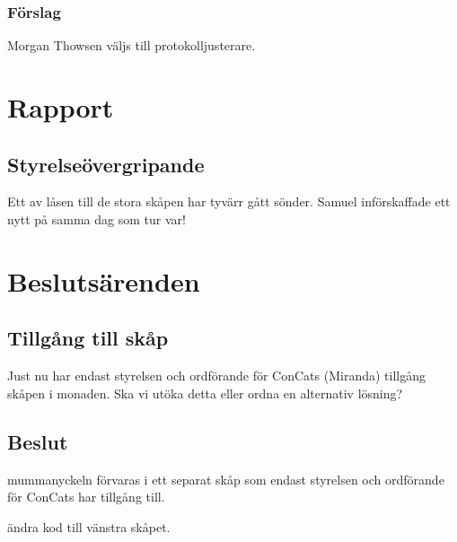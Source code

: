 \documentclass[protokoll]{dvd}
\begin{document}
        \subsubsection*{Förslag}
            \begin{attsatser}
                \item Morgan Thowsen väljs till protokolljusterare.
            \end{attsatser}


\newpage

\newpage

\section{Rapport}
   \subsection*{Styrelseövergripande}
        Ett av låsen till de stora skåpen har tyvärr gått sönder. Samuel införskaffade ett nytt på samma dag som tur var!

\newpage

\section{Beslutsärenden}
    \subsection*{Tillgång till skåp}
    Just nu har endast styrelsen och ordförande för ConCats (Miranda) tillgång skåpen i monaden.
    Ska vi utöka detta eller ordna en alternativ lösning?

    \subsection*{Beslut}
        \begin{attsatser}
            \item mummanyckeln förvaras i ett separat skåp som endast styrelsen och ordförande för ConCats har tillgång till.
            \item ändra kod till vänstra skåpet.
        \end{attsatser}
\end{document}
